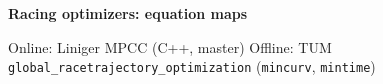 \documentclass[10pt]{article}
\begin{document}
{\setlength{\parindent}{0pt}%
{\LARGE\sffamily\bfseries Racing optimizers: equation maps}\par\vspace{3pt}
{\small\sffamily Online: Liniger MPCC (C++, master) \quad\textbullet\quad Offline: TUM
\texttt{global\_racetrajectory\_optimization} (\texttt{mincurv}, \texttt{mintime})}\par\vspace{6pt}}

\end{document}
